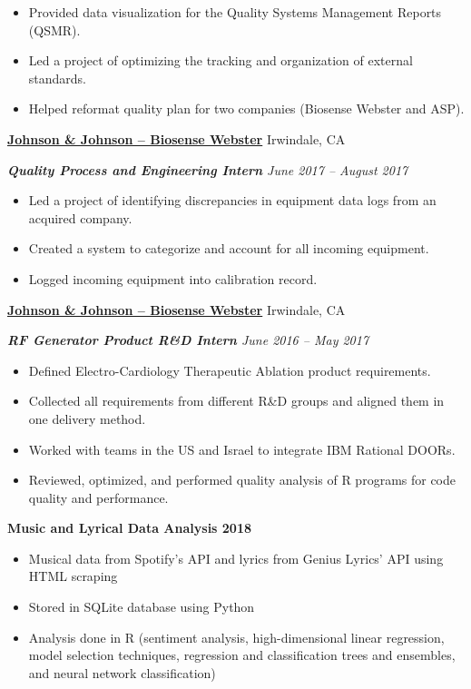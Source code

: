 \documentclass[9pt,letterpaper]{article}
\newcommand{\sectionHead}[1]{\vspace{.7ex} \noindent {\large \textbf{#1} \titlerule[.4pt]}}%
\begin{document}
\begin{description}[noitemsep]
		\begin{itemize}[noitemsep]
			\item Provided data visualization for the Quality Systems Management Reports (QSMR).
			\item Led a project of optimizing the tracking and organization of external standards.
			\item Helped reformat quality plan for two companies (Biosense Webster and ASP).
		\end{itemize}
		\item \textbf{\ul{Johnson \& Johnson -- Biosense Webster}} \hfill Irwindale, CA
		\item \textit{\textbf{Quality Process and Engineering Intern} \hfill June 2017 -- August 2017}
		\begin{itemize}[noitemsep]
			\item Led a project of identifying discrepancies in equipment data logs from an acquired company.
			\item Created a system to categorize and account for all incoming equipment.
			\item Logged incoming equipment into calibration record.
		\end{itemize}
		\newpage
		\item \textbf{\ul{Johnson \& Johnson -- Biosense Webster}} \hfill Irwindale, CA
		\item \textit{\textbf{RF Generator Product R\&D Intern} \hfill June 2016 -- May 2017}
		\begin{itemize}[noitemsep]
			\item Defined Electro-Cardiology Therapeutic Ablation product requirements.
			\item Collected all requirements from different R\&D groups and aligned them in one delivery method.
			\item Worked with teams in the US and Israel to integrate IBM Rational DOORs.
			\item Reviewed, optimized, and performed quality analysis of R programs for code quality and performance.
		\end{itemize}
	\end{description}
	
	\sectionHead{Projects}
	\begin{description}[noitemsep]
		\item \textbf{Music and Lyrical Data Analysis \hfill 2018}
		\begin{itemize}[noitemsep]
			\item Musical data from Spotify's API and lyrics from Genius Lyrics' API using HTML scraping
			\item Stored in SQLite database using Python
			\item Analysis done in R (sentiment analysis, high-dimensional linear regression, model selection techniques, regression and classification trees and ensembles, and neural network classification)
		\end{itemize}
	\end{description}
	
\end{document}
